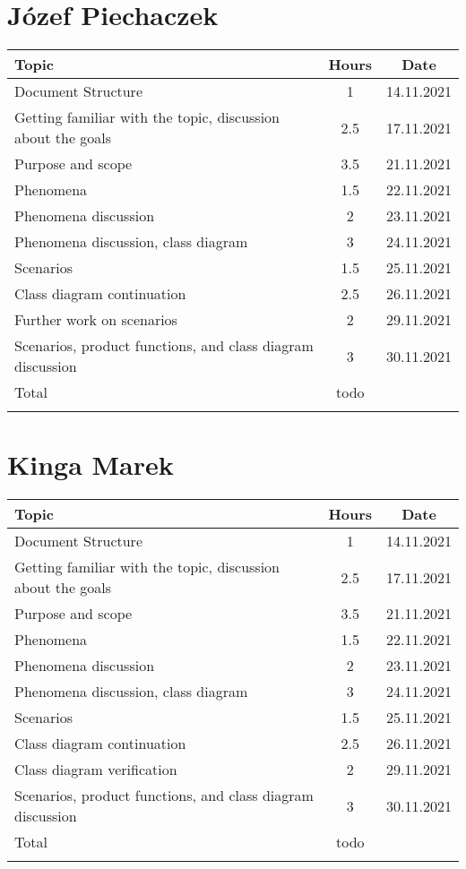 \section*{Józef Piechaczek}
\begin{table}[H]
    \centering
    \begin{tabular}{lcc} \Xhline{1.5pt}
        Topic &  Hours & Date \\ \hline
        Document Structure & 1 & 14.11.2021 \\ 
        Getting familiar with the topic, discussion about the goals & 2.5 & 17.11.2021 \\ 
        Purpose and scope & 3.5 & 21.11.2021 \\ 
        Phenomena & 1.5 & 22.11.2021 \\ 
        Phenomena discussion & 2 & 23.11.2021 \\
        Phenomena discussion, class diagram & 3 & 24.11.2021 \\ 
        Scenarios & 1.5 & 25.11.2021 \\
        Class diagram continuation & 2.5 & 26.11.2021 \\ 
        Further work on scenarios & 2 & 29.11.2021 \\
        Scenarios, product functions, and class diagram discussion & 3 & 30.11.2021\\ \hline
        Total &  todo & \\ \Xhline{1.5pt}
    \end{tabular}
\end{table}

\section*{Kinga Marek}
\begin{table}[H]
    \centering
    \begin{tabular}{lcc} \Xhline{1.5pt}
        Topic &  Hours & Date \\ \hline
        Document Structure & 1 & 14.11.2021 \\ 
        Getting familiar with the topic, discussion about the goals & 2.5 & 17.11.2021 \\ 
        Purpose and scope & 3.5 & 21.11.2021 \\
        Phenomena & 1.5 & 22.11.2021 \\ 
        Phenomena discussion & 2 & 23.11.2021 \\
        Phenomena discussion, class diagram & 3 & 24.11.2021 \\ 
        Scenarios & 1.5 & 25.11.2021 \\ 
        Class diagram continuation & 2.5 & 26.11.2021 \\
        Class diagram verification & 2 & 29.11.2021 \\
        Scenarios, product functions, and class diagram discussion & 3 & 30.11.2021\\ \hline
        Total & todo & \\ \Xhline{1.5pt}
    \end{tabular}
\end{table}
